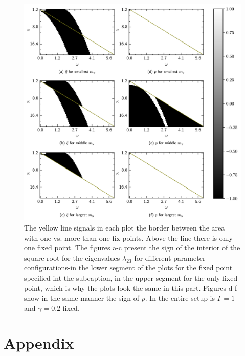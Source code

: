 \documentclass{article}
\begin{document}
\begin{figure}
    \centering
    \includegraphics{pictures/lam2_anal.png}
    \caption{The yellow line signals in each plot the border between the area with one vs. more than one fix points. Above the line there is only one fixed point. The figures a-c present the sign of the interior of the square root for the eigenvalues $\lambda_{23}$ for different parameter configurations-in the lower segment of the plots for the fixed point specified int the subcaption, in the upper segment for the only fixed point, which is why the plots look the same in this part. Figures d-f show in the same manner the sign of $p$. In the entire setup is $\Gamma=1$ and $\gamma=0.2$ fixed.}
\end{figure}




\newpage
\appendix
\section*{Appendix}
\end{document}
